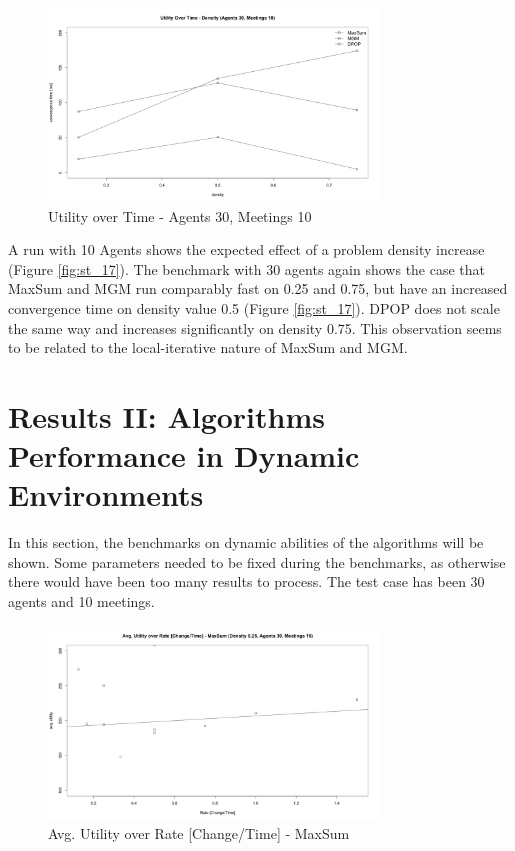 \begin{figure}[H]
\centering
\includegraphics[width=330px]{graphics/experiments/static/st_18}
\caption{Utility over Time - Agents 30, Meetings 10}
\label{fig:st_18}
\end{figure}

A run with 10 Agents shows the expected effect of a problem density increase (Figure \ref{fig:st_17}). The benchmark with 30 agents again shows the case that MaxSum and MGM run comparably fast on 0.25 and 0.75, but have an increased convergence time on density value 0.5 (Figure \ref{fig:st_17}). DPOP does not scale the same way and increases significantly on density 0.75. This observation seems to be related to the local-iterative nature of MaxSum and MGM.


\section{Results II: Algorithms Performance in Dynamic Environments}

In this section, the benchmarks on dynamic abilities of the algorithms will be shown. Some parameters needed to be fixed during the benchmarks, as otherwise there would have been too many results to process. The test case has been 30 agents and 10 meetings.

\begin{figure}[H]
\centering
\includegraphics[width=330px]{graphics/experiments/dynamic/d_1.png}
\caption{Avg. Utility over Rate [Change/Time] - MaxSum}
\label{fig:d_1}
\end{figure}

